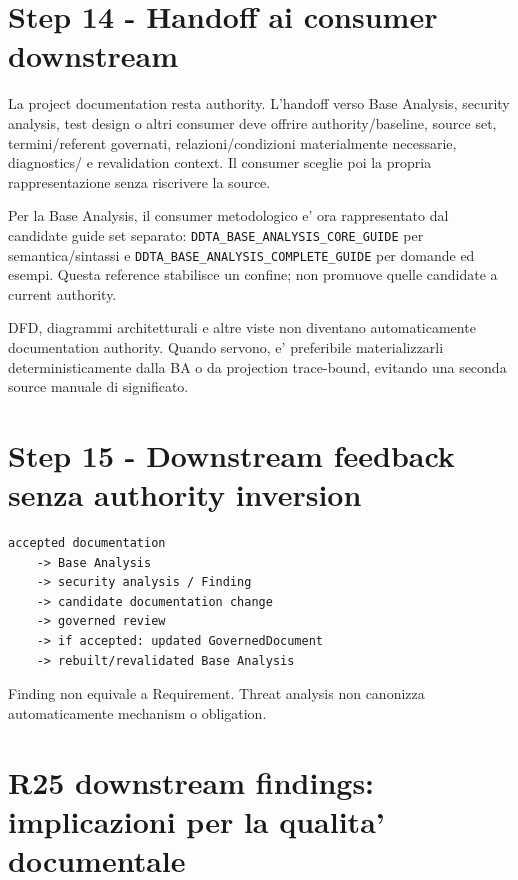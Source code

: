 \documentclass[11pt,a4paper]{article}
\begin{document}
\section{Step 14 - Handoff ai consumer downstream}
\closedtag

La project documentation resta authority. L'handoff verso Base Analysis, security analysis, test design o altri consumer deve offrire authority/baseline, source set, termini/referent governati, relazioni/condizioni materialmente necessarie, diagnostics/\NS{} e revalidation context. Il consumer sceglie poi la propria rappresentazione senza riscrivere la source.

\begin{ddtacheck}[title={R43 handoff target}]
Per la Base Analysis, il consumer metodologico e' ora rappresentato dal candidate guide set separato: \texttt{DDTA\_BASE\_ANALYSIS\_CORE\_GUIDE} per semantica/sintassi e \texttt{DDTA\_BASE\_ANALYSIS\_COMPLETE\_GUIDE} per domande ed esempi. Questa reference stabilisce un confine; non promuove quelle candidate a current authority.
\end{ddtacheck}

\begin{ddtaprinciple}[title={View generation}]
DFD, diagrammi architetturali e altre viste non diventano automaticamente documentation authority. Quando servono, e' preferibile materializzarli deterministicamente dalla BA o da projection trace-bound, evitando una seconda source manuale di significato.
\end{ddtaprinciple}

\section{Step 15 - Downstream feedback senza authority inversion}
\closedtag

\begin{lstlisting}
accepted documentation
    -> Base Analysis
    -> security analysis / Finding
    -> candidate documentation change
    -> governed review
    -> if accepted: updated GovernedDocument
    -> rebuilt/revalidated Base Analysis
\end{lstlisting}

Finding non equivale a Requirement. Threat analysis non canonizza automaticamente mechanism o obligation.

\section{R25 downstream findings: implicazioni per la qualita' documentale}
\end{document}
